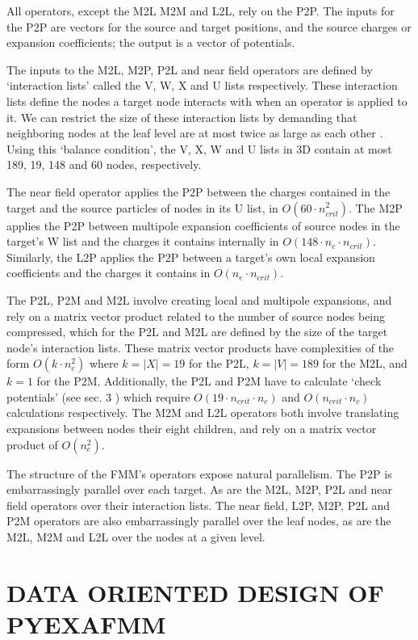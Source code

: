 \documentclass{IEEEcsmag}
\begin{document}
All operators, except the M2L M2M and L2L, rely on the P2P. The inputs for the P2P are vectors for the source and target positions, and the source charges or expansion coefficients; the output is a vector of potentials.

The inputs to the M2L, M2P, P2L and near field operators are defined by `interaction lists' called the V, W, X and U lists respectively. These interaction lists define the nodes a target node interacts with when an operator is applied to it. We can restrict the size of these interaction lists by demanding that neighboring nodes at the leaf level are at most twice as large as each other \cite{Sundar2007}. Using this `balance condition', the V, X, W and U lists in 3D contain at most 189, 19, 148 and 60 nodes, respectively.

The near field operator applies the P2P between the charges contained in the target and the source particles of nodes in its U list, in $O(60 \cdot n_{crit}^2)$. The M2P applies the P2P between multipole expansion coefficients of source nodes in the target's W list and the charges it contains internally in $O(148 \cdot n_e \cdot n_{crit})$. Similarly, the L2P applies the P2P between a target's own local expansion coefficients and the charges it contains in $O(n_e \cdot n_{crit})$.

The P2L, P2M and M2L involve creating local and multipole expansions, and rely on a matrix vector product related to the number of source nodes being compressed, which for the P2L and M2L are defined by the size of the target node's interaction lists. These matrix vector products have complexities of the form $O(k \cdot n_e^2)$ where $k = |X| = 19$ for the P2L, $k = |V| = 189$ for the M2L, and $k = 1$ for the P2M. Additionally, the P2L and P2M have to calculate `check potentials' (see sec. 3 \cite{Ying2004}) which require $O(19 \cdot n_{crit} \cdot n_c)$ and $O(n_{crit} \cdot n_c)$ calculations respectively. The M2M and L2L operators both involve translating expansions between nodes their eight children, and rely on a matrix vector product of $O(n_e^2)$.

The structure of the FMM's operators expose natural parallelism. The P2P is embarrassingly parallel over each target. As are the M2L, M2P, P2L and near field operators over their interaction lists. The near field, L2P, M2P, P2L and P2M operators are also embarrassingly parallel over the leaf nodes, as are the M2L, M2M and L2L over the nodes at a given level.

\section{DATA ORIENTED DESIGN OF PYEXAFMM}
\end{document}
